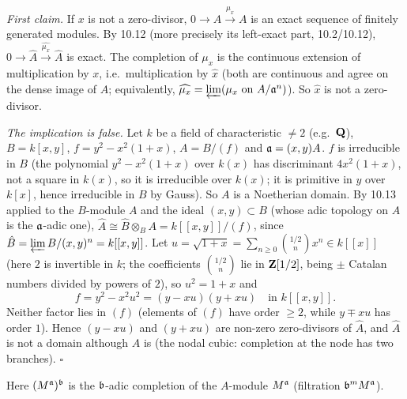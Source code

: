 \documentclass[11pt]{article}
\begin{document}
\pf
\emph{First claim.} If $x$ is not a zero-divisor, $0\to A\xrightarrow{\mu_x}A$ is an exact sequence of finitely generated modules. By 10.12 (more precisely its left-exact part, 10.2/10.12), $0\to\hat A\xrightarrow{\widehat{\mu_x}}\hat A$ is exact. The completion of $\mu_x$ is the continuous extension of multiplication by $x$, i.e.\ multiplication by $\hat x$ (both are continuous and agree on the dense image of $A$; equivalently, $\widehat{\mu_x}=\varprojlim(\mu_x\text{ on }A/\mathfrak a^n)$). So $\hat x$ is not a zero-divisor.

\emph{The implication is false.} Let $k$ be a field of characteristic $\ne2$ (e.g.\ $\mathbf Q$), $B=k[x,y]$, $f=y^2-x^2(1+x)$, $A=B/(f)$ and $\mathfrak a=(x,y)A$. $f$ is irreducible in $B$ (the polynomial $y^2-x^2(1+x)$ over $k(x)$ has discriminant $4x^2(1+x)$, not a square in $k(x)$, so it is irreducible over $k(x)$; it is primitive in $y$ over $k[x]$, hence irreducible in $B$ by Gauss). So $A$ is a Noetherian domain. By 10.13 applied to the $B$-module $A$ and the ideal $(x,y)\subset B$ (whose adic topology on $A$ is the $\mathfrak a$-adic one), $\hat A\cong\hat B\otimes_BA=k[[x,y]]/(f)$, since $\hat B=\varprojlim B/(x,y)^n=k[[x,y]]$. Let $u=\sqrt{1+x}=\sum_{n\ge0}\binom{1/2}{n}x^n\in k[[x]]$ (here $2$ is invertible in $k$; the coefficients $\binom{1/2}{n}$ lie in $\mathbf Z[1/2]$, being $\pm$ Catalan numbers divided by powers of $2$), so $u^2=1+x$ and
\[
f=y^2-x^2u^2=(y-xu)(y+xu)\quad\text{in }k[[x,y]].
\]
Neither factor lies in $(f)$ (elements of $(f)$ have order $\ge2$, while $y\mp xu$ has order $1$). Hence $(y-xu)$ and $(y+xu)$ are non-zero zero-divisors of $\hat A$, and $\hat A$ is not a domain although $A$ is (the nodal cubic: completion at the node has two branches). \hfill$\square$

\pf
Here $(M^\mathfrak a)^\mathfrak b$ is the $\mathfrak b$-adic completion of the $A$-module $M^\mathfrak a$ (filtration $\mathfrak b^mM^\mathfrak a$).
\end{document}
